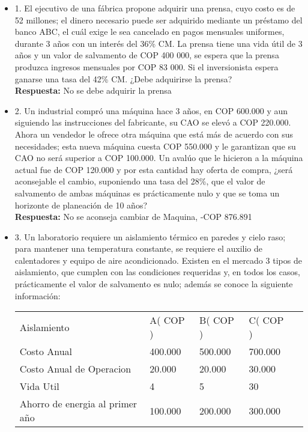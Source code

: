 \begin{itemize}
 \item 1. El ejecutivo de una fábrica propone adquirir una prensa, cuyo costo es de 52 millones; el dinero necesario puede ser adquirido mediante un préstamo del banco ABC, el cuál exige le sea cancelado en pagos mensuales uniformes, durante 3 años con un interés del 36\% CM. La prensa tiene una vida útil de 3 años y un valor de salvamento de COP 400 000, se espera que la prensa produzca ingresos mensuales por COP 83 000. Si el inversionista espera ganarse una tasa del 42\% CM. ¿Debe adquirirse la prensa? \\

       \textbf{Respuesta:} No se debe adquirir la prensa
       \medskip

 \item 2. Un industrial compró una máquina hace 3 años, en COP 600.000 y aun siguiendo las instrucciones del fabricante, su CAO se elevó a COP 220.000. Ahora un vendedor le ofrece otra máquina que está más de acuerdo con sus necesidades; esta nueva máquina cuesta COP 550.000 y le garantizan que su CAO no será superior a COP 100.000. Un avalúo que le hicieron a la máquina actual fue de COP 120.000 y por esta cantidad  hay oferta de compra, ¿será aconsejable el cambio, suponiendo una tasa del 28\%, que el valor de salvamento de ambas máquinas es prácticamente nulo y que se toma un horizonte de planeación de 10 años? \\

       \textbf{Respuesta:} No se aconseja cambiar de Maquina, -COP 876.891
       \medskip

 \item 3. Un laboratorio requiere un aislamiento térmico en paredes y cielo raso; para mantener una temperatura constante, se requiere el auxilio de calentadores y equipo de aire acondicionado. Existen en el mercado 3 tipos de aislamiento, que cumplen con las condiciones requeridas y, en todos los casos, prácticamente el valor de salvamento es nulo; además se conoce la siguiente información: \\

       \begin{table}[]
        \begin{tabular}{|l|l|l|l|l}
         \cline{1-4}
         Aislamiento                     & A( COP )   & B( COP )   & C( COP )   & \\ \cline{1-4}
         Costo Anual                     & 400.000 & 500.000 & 700.000 & \\ \cline{1-4}
         Costo Anual de Operacion        & 20.000  & 20.000  & 30.000  & \\ \cline{1-4}
         Vida Util                       & 4       & 5       & 30      & \\ \cline{1-4}
         Ahorro de energia al primer año & 100.000 & 200.000 & 300.000 & \\ \cline{1-4}
        \end{tabular}
       \end{table}


\end{itemize}
